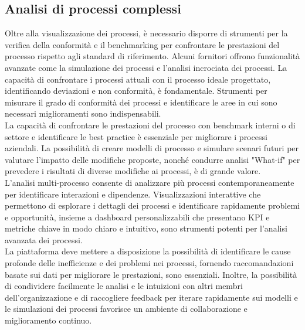 \documentclass{article}
\begin{document}
\subsection{Analisi di processi complessi}
Oltre alla visualizzazione dei processi, è necessario disporre di strumenti per la verifica della conformità e il benchmarking per confrontare le prestazioni del processo rispetto agli standard di riferimento. Alcuni fornitori offrono funzionalità avanzate come la simulazione dei processi e l'analisi incrociata dei processi. La capacità di confrontare i processi attuali con il processo ideale progettato, identificando deviazioni e non conformità, è fondamentale. Strumenti per misurare il grado di conformità dei processi e identificare le aree in cui sono necessari miglioramenti sono indispensabili.\\
La capacità di confrontare le prestazioni del processo con benchmark interni o di settore e identificare le best practice è essenziale per migliorare i processi aziendali. La possibilità di creare modelli di processo e simulare scenari futuri per valutare l'impatto delle modifiche proposte, nonché condurre analisi "What-if" per prevedere i risultati di diverse modifiche ai processi, è di grande valore.\\
L'analisi multi-processo consente di analizzare più processi contemporaneamente per identificare interazioni e dipendenze. Visualizzazioni interattive che permettono di esplorare i dettagli dei processi e identificare rapidamente problemi e opportunità, insieme a dashboard personalizzabili che presentano KPI e metriche chiave in modo chiaro e intuitivo, sono strumenti potenti per l'analisi avanzata dei processi.\\
La piattaforma deve mettere a disposizione la possibilità di identificare le cause profonde delle inefficienze e dei problemi nei processi, fornendo raccomandazioni basate sui dati per migliorare le prestazioni, sono essenziali. Inoltre, la possibilità di condividere facilmente le analisi e le intuizioni con altri membri dell'organizzazione e di raccogliere feedback per iterare rapidamente sui modelli e le simulazioni dei processi favorisce un ambiente di collaborazione e miglioramento continuo.
\end{document}
